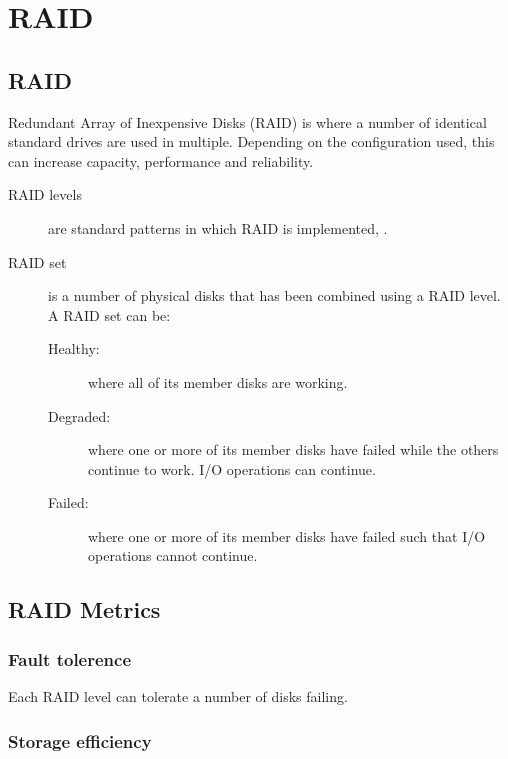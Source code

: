 \chapter{RAID}
\label{ch:raid}

\section{RAID}
\label{sec:raid}

Redundant Array of Inexpensive Disks (RAID) is where a number of
identical standard drives are used in multiple. Depending on the
configuration used, this can increase capacity, performance and
reliability.

\begin{description}
\item[RAID levels]
  are standard patterns in which RAID is implemented, .
\item[RAID set]
  is a number of physical disks that has been combined using a RAID level.
  A RAID set can be:
  
  \begin{description}
  \item[Healthy:]
    where all of its member disks are working.
  \item[Degraded:]
    where one or more of its member disks have failed while the others
    continue to work. I/O operations can continue.
  \item[Failed:]
    where one or more of its member disks have failed such that I/O
    operations cannot continue.
  \end{description}
\end{description}

\section{RAID Metrics}
\label{sec:raid-metrics}

\subsection{Fault tolerence}
\label{sec:fault-tolerence}

Each RAID level can tolerate a number of disks failing.

\subsection{Storage efficiency}
\label{sec:storage-efficiency}


